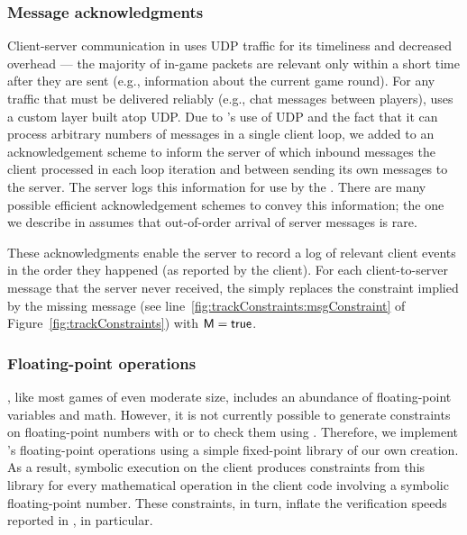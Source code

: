 \subsubsection{Message acknowledgments}
Client-server communication in \xpilot uses UDP traffic for its
timeliness and decreased overhead --- the majority of in-game packets
are relevant only within a short time after they are sent (e.g.,
information about the current game round).  For any traffic that must
be delivered reliably (e.g., chat messages between players), \xpilot
uses a custom layer built atop UDP.  Due to \xpilot's use of UDP and
the fact that it can process arbitrary numbers of messages in a single
client loop, we added to \xpilot an acknowledgement scheme to inform
the server of which inbound messages the client processed in each
loop iteration and between sending its own messages to the server.  The
server logs this information for use by the \verifier.  There are many
possible efficient acknowledgement schemes to convey this information;
the one we describe in  assumes that
out-of-order arrival of server messages is rare.

These acknowledgments enable the server to record a log of relevant
client events in the order they happened (as reported by the client).
For each client-to-server message that the server never received, the
\verifier simply replaces the constraint \msgConstraint implied by the
missing message (see line~\ref{fig:trackConstraints:msgConstraint} of
Figure~\ref{fig:trackConstraints}) with $\mathsf M\space =
\mathsf{true}$.

\subsubsection{Floating-point operations}
\xpilot, like most games of even moderate size, includes an abundance
of floating-point variables and math.  However, it is not currently
possible to generate constraints on floating-point numbers with \klee
or to check them using \stp.  Therefore, we implement \xpilot's
floating-point operations using a simple fixed-point library of our
own creation.  As a result, symbolic execution on the \xpilot client
produces constraints from this library for every mathematical
operation in the client code involving a symbolic floating-point
number.  These constraints, in turn, inflate the verification speeds
reported in , in particular.

